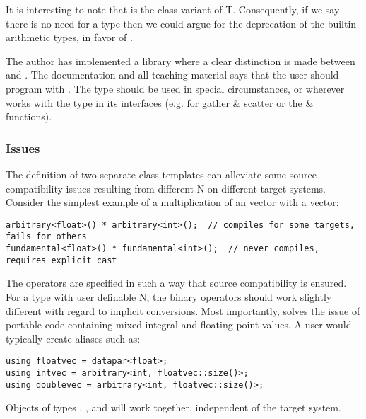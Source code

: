 It is interesting to note that  is the class variant of \type T.
Consequently, if we say there is no need for a  type then we could argue for the deprecation of the builtin arithmetic types, in favor of . 

The author has implemented a library where a clear distinction is made between  and .
The documentation and all teaching material says that the user should program with .
The  type should be used in special circumstances, or wherever  works with the  type in its interfaces (e.g. for gather \& scatter or the  \&  functions).

\subsubsection{Issues}
The definition of two separate class templates can alleviate some source compatibility issues resulting from different \code N on different target systems.
Consider the simplest example of a multiplication of an \intt vector with a \float vector:
\smallskip\begin{lstlisting}[style=Vc]
arbitrary<float>() * arbitrary<int>();  // compiles for some targets, fails for others
fundamental<float>() * fundamental<int>();  // never compiles, requires explicit cast
\end{lstlisting}
The \datapar[<T>] operators are specified in such a way that source compatibility is ensured.
For a type with user definable \code N, the binary operators should work slightly different with regard to implicit conversions.
Most importantly,  solves the issue of portable code containing mixed integral and floating-point values.
A user would typically create aliases such as:
\smallskip\begin{lstlisting}[style=Vc]
using floatvec = datapar<float>;
using intvec = arbitrary<int, floatvec::size()>;
using doublevec = arbitrary<int, floatvec::size()>;
\end{lstlisting}
Objects of types , , and  will work together, independent of the target system.

